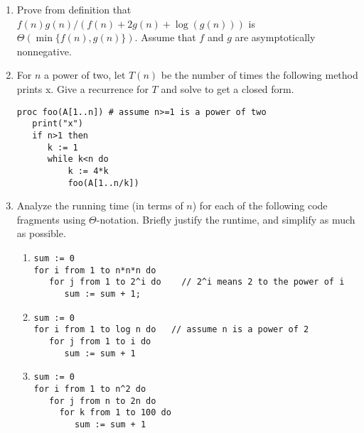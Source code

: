 \documentclass[12pt]{article}
\begin{document}
\begin{enumerate}
\item Prove from definition that $f(n)g(n)/(f(n)+2g(n)+\log (g(n)))$ is $\Theta(\min\{f(n),g(n)\} )$.
Assume that $f$ and $g$ are asymptotically nonnegative.
\item For $n$ a power of two, let $T(n)$ be the number of times the
following method prints x. Give a recurrence for $T$ and solve
to get a closed form.
\begin{verbatim}
proc foo(A[1..n]) # assume n>=1 is a power of two
   print("x")
   if n>1 then
      k := 1
      while k<n do
          k := 4*k
          foo(A[1..n/k])
\end{verbatim}
\item Analyze the running time (in terms of $n$) for each of the following
code fragments using $\Theta$-notation.  Briefly justify the runtime,
and simplify as much as possible.
\begin{enumerate}
\item
\begin{verbatim}
sum := 0
for i from 1 to n*n*n do
   for j from 1 to 2^i do    // 2^i means 2 to the power of i
      sum := sum + 1;
\end{verbatim}

\item
\begin{verbatim}
sum := 0
for i from 1 to log n do   // assume n is a power of 2
   for j from 1 to i do
      sum := sum + 1
\end{verbatim}

\item
\begin{verbatim}
sum := 0
for i from 1 to n^2 do
   for j from n to 2n do
     for k from 1 to 100 do
        sum := sum + 1
\end{verbatim}

\end{enumerate}
\end{enumerate}
\end{document}
